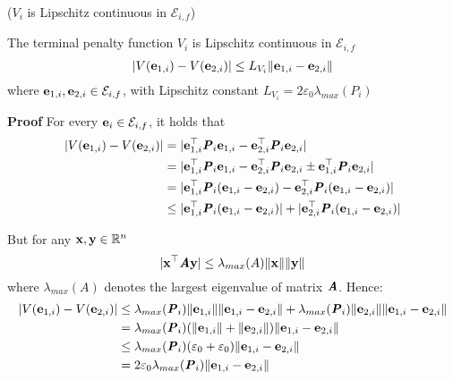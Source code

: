 \begin{bw_box}
\begin{lemma} ($V_i$ is Lipschitz continuous in $\mathcal{E}_{i,f}$)

  The terminal penalty function $V_i$ is Lipschitz continuous in
  $\mathcal{E}_{i,f}$
  $$|V(\bm{\mathbf{e}}_{1,i}) - V(\bm{\mathbf{e}}_{2,i})| \leq L_{V_i} \|\bm{\mathbf{e}}_{1,i} - \bm{\mathbf{e}}_{2,i}\|$$
  where $\bm{\mathbf{e}}_{1,i}, \bm{\mathbf{e}}_{2,i} \in \mathcal{E}_{i,f}$,
  with Lipschitz constant $L_{V_i} = 2 \varepsilon_0 \lambda_{max}(P_i)$\\

  \begin{gg_box}
  \textbf{Proof} For every $\bm{\mathbf{e}}_i \in \mathcal{E}_{i,f}$, it holds that
  \begin{align}
    |V(\bm{\mathbf{e}}_{1,i}) - V(\bm{\mathbf{e}}_{2,i})| &= |\bm{\mathbf{e}}_{1,i}^{\top} \bm{\mathit{P}}_i \bm{\mathbf{e}}_{1,i} - \bm{\mathbf{e}}_{2,i}^{\top} \bm{\mathit{P}}_i \bm{\mathbf{e}}_{2,i}| \\
      &= |\bm{\mathbf{e}}_{1,i}^{\top} \bm{\mathit{P}}_i \bm{\mathbf{e}}_{1,i} - \bm{\mathbf{e}}_{2,i}^{\top} \bm{\mathit{P}}_i \bm{\mathbf{e}}_{2,i} \pm \bm{\mathbf{e}}_{1,i}^{\top} \bm{\mathit{P}}_i \bm{\mathbf{e}}_{2,i}| \\
      &= |\bm{\mathbf{e}}_{1,i}^{\top} \bm{\mathit{P}}_i (\bm{\mathbf{e}}_{1,i}-\bm{\mathbf{e}}_{2,i}) - \bm{\mathbf{e}}_{2,i}^{\top} \bm{\mathit{P}}_i (\bm{\mathbf{e}}_{1,i}-\bm{\mathbf{e}}_{2,i})| \\
      &\leq |\bm{\mathbf{e}}_{1,i}^{\top} \bm{\mathit{P}}_i (\bm{\mathbf{e}}_{1,i}-\bm{\mathbf{e}}_{2,i})| + |\bm{\mathbf{e}}_{2,i}^{\top} \bm{\mathit{P}}_i (\bm{\mathbf{e}}_{1,i}-\bm{\mathbf{e}}_{2,i})|
  \end{align}

  But for any $\bm{\mathbf{x}}, \bm{\mathbf{y}} \in \mathbb{R}^n$
  $$|\bm{\mathbf{x}}^{\top} \bm{\mathit{A}} \bm{\mathbf{y}}| \leq \lambda_{max}(A) \|\bm{\mathbf{x}}\| \|\bm{\mathbf{y}}\|$$
  where $\lambda_{max}(A)$ denotes the largest eigenvalue of matrix $\bm{\mathit{A}}$.
  Hence:
  \begin{align}
    |V(\bm{\mathbf{e}}_{1,i}) - V(\bm{\mathbf{e}}_{2,i})| &\leq
    \lambda_{max}(\bm{\mathit{P}}_i) \|\bm{\mathbf{e}}_{1,i}\| \|\bm{\mathbf{e}}_{1,i} - \bm{\mathbf{e}}_{2,i}\| +
    \lambda_{max}(\bm{\mathit{P}}_i) \|\bm{\mathbf{e}}_{2,i}\| \|\bm{\mathbf{e}}_{1,i} - \bm{\mathbf{e}}_{2,i}\| \\
    &= \lambda_{max}(\bm{\mathit{P}}_i) (\|\bm{\mathbf{e}}_{1,i}\| + \|\bm{\mathbf{e}}_{2,i}\|)\|\bm{\mathbf{e}}_{1,i} - \bm{\mathbf{e}}_{2,i}\| \\
    & \leq \lambda_{max}(\bm{\mathit{P}}_i) (\varepsilon_0 + \varepsilon_0)\|\bm{\mathbf{e}}_{1,i} - \bm{\mathbf{e}}_{2,i}\| \\
    &= 2 \varepsilon_0 \lambda_{max}(\bm{\mathit{P}}_i) \|\bm{\mathbf{e}}_{1,i} - \bm{\mathbf{e}}_{2,i}\|
  \end{align}
  \qedsymbol
  \end{gg_box}
\label{lemma:V_Lipschitz_e_0}
\end{lemma}
\end{bw_box}


